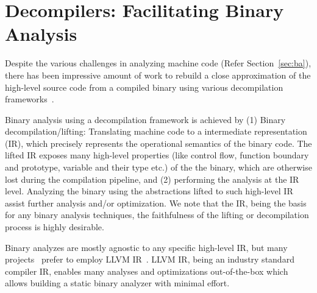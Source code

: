 \section{Decompilers: Facilitating Binary Analysis}\label{sec:decompilers}

Despite the various challenges in analyzing machine code (Refer
    Section~\ref{sec:ba}), there has been impressive amount of work to rebuild
a close approximation of the high-level source code from a compiled binary
using various decompilation
frameworks~\cite{McSema:Recon14,Remill,Angr1,BAP:CAV11,Radare2,FCD,BitBlaze:2008,hexray,Fokin:2011,eschulte2018bed,katz2018rnn,Schwartz:2013,IDA,mctoll,revgen}.

Binary analysis using a decompilation framework is achieved by (1) Binary
decompilation/lifting: Translating machine code to a intermediate
representation (IR), which precisely represents the operational semantics of
the binary code. The lifted IR exposes many high-level properties (like control
    flow, function boundary and prototype, variable and their type etc.) of the
the binary, which are otherwise lost during the compilation pipeline, and (2)
  performing the analysis at the IR level.  Analyzing the binary using the
  abstractions lifted to such high-level IR assist further analysis and/or
  optimization. We note that the IR, being the basis for any binary analysis
  techniques, the faithfulness of the lifting or decompilation process is
  highly desirable. 

Binary analyzes are mostly agnostic to any specific high-level IR, but many
projects~\cite{McSema:Recon14,Remill,FCD,reopt,mctoll} prefer to employ LLVM
IR~\cite{Lattner:2004}. LLVM IR, being an industry standard compiler IR,
  enables many analyses and optimizations out-of-the-box which allows building
  a static binary analyzer with minimal effort.

